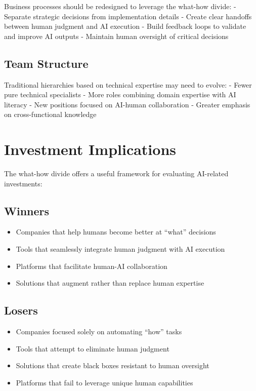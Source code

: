 \documentclass[
  Letterpaper,
]{scrbook}
\providecommand{\tightlist}{%
  \setlength{\itemsep}{0pt}\setlength{\parskip}{0pt}}\usepackage{longtable,booktabs,array}
\begin{document}
Business processes should be redesigned to leverage the what-how divide:
- Separate strategic decisions from implementation details - Create
clear handoffs between human judgment and AI execution - Build feedback
loops to validate and improve AI outputs - Maintain human oversight of
critical decisions

\subsection{Team Structure}\label{team-structure}

Traditional hierarchies based on technical expertise may need to evolve:
- Fewer pure technical specialists - More roles combining domain
expertise with AI literacy - New positions focused on AI-human
collaboration - Greater emphasis on cross-functional knowledge

\section{Investment Implications}\label{investment-implications}

The what-how divide offers a useful framework for evaluating AI-related
investments:

\subsection{Winners}\label{winners}

\begin{itemize}
\tightlist
\item
  Companies that help humans become better at ``what'' decisions
\item
  Tools that seamlessly integrate human judgment with AI execution
\item
  Platforms that facilitate human-AI collaboration
\item
  Solutions that augment rather than replace human expertise
\end{itemize}

\subsection{Losers}\label{losers}

\begin{itemize}
\tightlist
\item
  Companies focused solely on automating ``how'' tasks
\item
  Tools that attempt to eliminate human judgment
\item
  Solutions that create black boxes resistant to human oversight
\item
  Platforms that fail to leverage unique human capabilities
\end{itemize}
\end{document}
